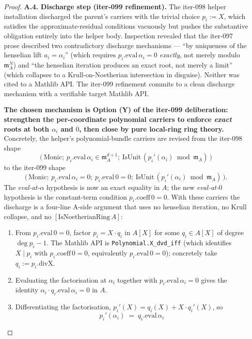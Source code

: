 \begin{proof}
\textbf{A.4. Discharge step (iter-099 refinement).} The
iter-098 helper installation discharged the parent's carriers
with the trivial choice $p_i := X$, which satisfies the
approximate-residual conditions vacuously but pushes the
substantive obligation entirely into the helper body. Inspection
revealed that the iter-097 prose described two contradictory
discharge mechanisms — ``by uniqueness of the henselian lift
$a_i = \alpha_i$'' (which requires $p_i.\mathrm{eval}\,\alpha_i
= 0$ \emph{exactly}, not merely modulo $\mathfrak m_A^N$) and
``the henselian iteration produces an exact root, not merely a
limit'' (which collapses to a Krull-on-Noetherian intersection
in disguise). Neither was cited to a Mathlib API. The iter-099
refinement commits to a clean discharge mechanism with a
verifiable target Mathlib API.

\textbf{The chosen mechanism is Option (Y) of the iter-099
deliberation: strengthen the per-coordinate polynomial carriers
to enforce \emph{exact} roots at both $\alpha_i$ and $0$, then
close by pure local-ring ring theory.}
Concretely, the helper's
polynomial-bundle carriers are revised from the iter-098 shape
\[
\bigl(\,\mathrm{Monic};\ p_i.\mathrm{eval}\,\alpha_i \in
\mathfrak m_A^{d+1};\ \mathrm{IsUnit}\,(p_i'(\alpha_i)\bmod
\mathfrak m_A)\,\bigr)
\]
to the iter-099 shape
\[
\bigl(\,\mathrm{Monic};\ p_i.\mathrm{eval}\,\alpha_i = 0;\
p_i.\mathrm{eval}\,0 = 0;\ \mathrm{IsUnit}\,(p_i'(\alpha_i)\bmod
\mathfrak m_A)\,\bigr).
\]
The \emph{eval-at-$\alpha$} hypothesis is now an exact equality
in $A$; the new \emph{eval-at-$0$} hypothesis is the constant-term
condition $p_i.\mathrm{coeff}\,0 = 0$.
With these carriers the discharge is a four-line A-side argument
that uses no henselian iteration, no Krull collapse, and no
$[\mathrm{IsNoetherianRing}\,A]$:
\begin{enumerate}
\item From $p_i.\mathrm{eval}\,0 = 0$, factor $p_i = X \cdot q_i$
in $A[X]$ for some $q_i \in A[X]$ of degree $\deg p_i - 1$.
The Mathlib API is \texttt{Polynomial.X\_dvd\_iff} (which
identifies $X \mid p_i$ with $p_i.\mathrm{coeff}\,0 = 0$,
equivalently $p_i.\mathrm{eval}\,0 = 0$); concretely take
$q_i := p_i.\mathrm{divX}$.
\item Evaluating the factorisation at $\alpha_i$ together with
$p_i.\mathrm{eval}\,\alpha_i = 0$ gives the identity
$\alpha_i \cdot q_i.\mathrm{eval}\,\alpha_i = 0$ in $A$.
\item Differentiating the factorisation, $p_i'(X) = q_i(X) +
X \cdot q_i'(X)$, so
\[
p_i'(\alpha_i) \;=\; q_i.\mathrm{eval}\,\alpha_i
\]
\end{enumerate}
\end{proof}
